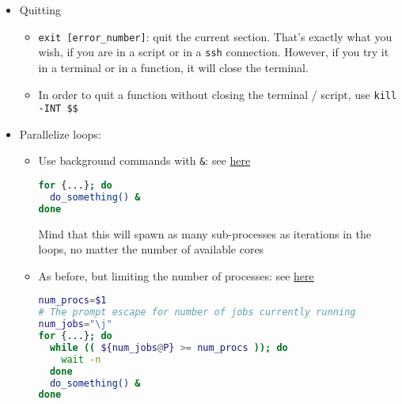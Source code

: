 \documentclass[a4paper,12pt,%
              final%
              ]{article}
\begin{document}
\begin{itemize}
\begin{itemize}
\begin{itemize}
        \end{itemize}
    \end{itemize}
  \item Quitting
    \begin{itemize}
      \item \verb|exit [error_number]|: quit the current section. That's exactly what you wish, if you are in a script or in a \texttt{ssh} connection. However, if you try it in a terminal or in a function, it will close the terminal.
      \item In order to quit a function without closing the terminal / script, use \verb|kill -INT $$|
    \end{itemize}
  \item Parallelize loops:
    \begin{itemize}
      \item Use background commands with \verb|&|: see \href{https://unix.stackexchange.com/questions/103920/parallelize-a-bash-for-loop/103922}{here}
\begin{lstlisting}[language=bash]
for {...}; do
  do_something() &
done
\end{lstlisting}
        Mind that this will spawn as many sub-processes as iterations in the loops, no matter the number of available cores
      \item As before, but limiting the number of processes: see \href{https://stackoverflow.com/questions/38774355/how-to-parallelize-for-loop-in-bash-limiting-number-of-processes}{here}
\begin{lstlisting}[language=bash]
num_procs=$1
# The prompt escape for number of jobs currently running
num_jobs="\j"
for {...}; do
  while (( ${num_jobs@P} >= num_procs )); do
    wait -n
  done
  do_something() &
done
\end{lstlisting}
    \end{itemize}
\end{itemize}

\end{document}
